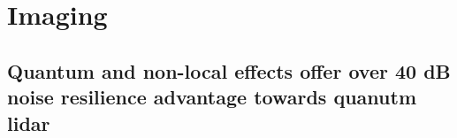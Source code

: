 \documentclass[../../note.tex]{subfiles}
\begin{document}
\chapter{Imaging}
\section{Quantum and non-local effects offer over 40 dB noise resilience advantage towards quanutm lidar}
\end{document}
